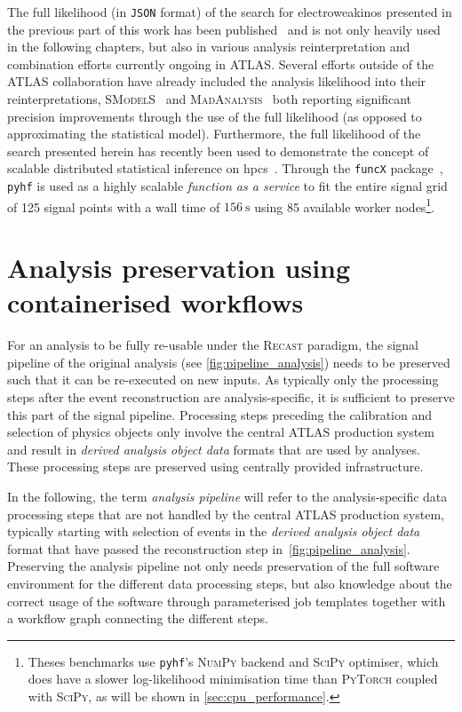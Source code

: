 The full likelihood (in \texttt{JSON} format) of the search for electroweakinos presented in the previous part of this work has been published~\cite{fullLH_1Lbb} and is not only heavily used in the following chapters, but also in various analysis reinterpretation and combination efforts currently ongoing in ATLAS. Several efforts outside of the ATLAS collaboration have already included the analysis likelihood into their reinterpretations, \eg \textsc{SModelS}~\cite{SModelS_pyhf:2020grj} and \textsc{MadAnalysis}~\cite{Goodsell:2020ddr,Fuks:2021wpe} both reporting significant precision improvements through the use of the full likelihood (as opposed to approximating the statistical model). Furthermore, the full likelihood of the search presented herein has recently been used to demonstrate the concept of scalable distributed statistical inference on \glspl{hpc}~\cite{Feickert:2021sua}. Through the \texttt{funcX} package~\cite{chard20funcx}, \texttt{pyhf} is used as a highly scalable \textit{function as a service} to fit the entire signal grid of 125 signal points with a wall time of $\SI{156}{\second}$ using 85 available worker nodes\footnote{Theses benchmarks use \texttt{pyhf}'s \textsc{NumPy} backend and \textsc{SciPy} optimiser, which does have a slower log-likelihood minimisation time than \eg \textsc{PyTorch} coupled with \textsc{SciPy}, as will be shown in \cref{sec:cpu_performance}.}.

\section{Analysis preservation using containerised workflows}\label{sec:recast_implementation}

For an analysis to be fully re-usable under the \textsc{Recast} paradigm, the signal pipeline of the original analysis (see \cref{fig:pipeline_analysis}) needs to be preserved such that it can be re-executed on new inputs. As typically only the processing steps after the event reconstruction are analysis-specific, it is sufficient to preserve this part of the signal pipeline. Processing steps preceding the calibration and selection of physics objects only involve the central ATLAS production system and result in \textit{derived analysis object data} formats that are used by analyses. These processing steps are preserved using centrally provided infrastructure.

   In the following, the term \textit{analysis pipeline} will refer to the analysis-specific data processing steps that are not handled by the central ATLAS production system, typically starting with selection of events in the \textit{derived analysis object data} format that have passed the reconstruction step in~\cref{fig:pipeline_analysis}. Preserving the analysis pipeline not only needs preservation of the full software environment for the different data processing steps, but also knowledge about the correct usage of the software through parameterised job templates together with a workflow graph connecting the different steps.

